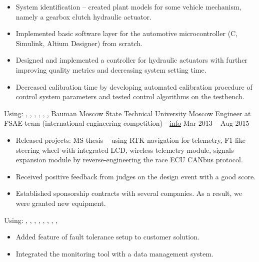 \begin{itemize}
    \item System identification -- created plant models for some vehicle mechanism, namely a gearbox clutch hydraulic actuator.
    \item Implemented basic software layer for the automotive microcontroller (C, Simulink, Altium Designer) from scratch.
    \item Designed and implemented a controller for hydraulic actuators with further improving quality metrics and decreasing system setting time.
    \item Decreased calibration time by developing automated calibration procedure of control system parameters and tested control algorithms on the testbench.
\end{itemize}
Using: , , , , , , 
\horizontalline
% 
\ressubheading
{Bauman Moscow State Technical University}
{}
{Moscow}
{Engineer at FSAE team (international engineering competition) - \href{https://baumanracing.ru/en/}{info}}
{Mar 2013 -- Aug 2015}
\begin{itemize}
    \item Released projects: MS thesis -- using RTK navigation for telemetry, F1-like steering wheel with integrated LCD, wireless telemetry module, signals expansion module by reverse-engineering the race ECU CANbus protocol.
    \item Received positive feedback from judges on the design event with a good score.
    \item Established sponsorship contracts with several companies. As a result, we were granted new equipment.
\end{itemize}
Using: , , , , , , , , 
\pagebreak
\\
% 
\begin{itemize}
    \item Added feature of fault tolerance setup to customer solution.
    \item Integrated the monitoring tool with a data management system.
\end{itemize}
